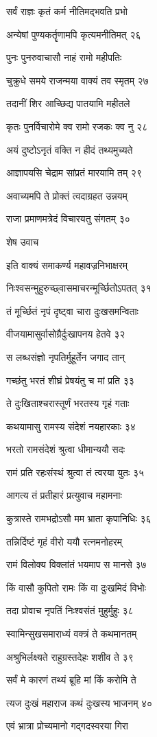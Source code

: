 सर्वं राज्ञः कृतं कर्म नीतिमद्भवति प्रभो

अन्येषां पुण्यकर्तॄणामपि कृत्यमनीतिमत् २६

पुनः पुनरुवाचासौ नाहं रामो महीपतिः

चुक्रुधे समये राजन्मया वाक्यं तव स्मृतम् २७

तदानीं शिर आच्छिद्य पातयामि महीतले

कृतः पुनर्विचारोमे क्व रामो रजकः क्व नु २८

अयं दुष्टोऽनृतं वक्ति न हीदं तथ्यमुच्यते

आज्ञापयसि चेद्राम सांप्रतं मारयामि तम् २९

अवाच्यमपि ते प्रोक्तं त्वदाग्रहत उन्नयम्

राजा प्रमाणमत्रेदं विचारयतु संगतम् ३०

शेष उवाच

इति वाक्यं समाकर्ण्य महावज्रनिभाक्षरम्

निःश्वसन्मुहुरुच्छ्वासमाचरन्मूर्च्छितोऽपतत् ३१

तं मूर्च्छितं नृपं दृष्ट्वा चारा दुःखसमन्विताः

वीजयामासुर्वासोग्रैर्दुःखापनय हेतवे ३२

स लब्धसंज्ञो नृपतिर्मुहूर्तेन जगाद तान्

गच्छंतु भरतं शीघ्रं प्रेषयंतु च मां प्रति ३३

ते दुःखिताश्चरास्तूर्णं भरतस्य गृहं गताः

कथयामासु रामस्य संदेशं नयहारकाः ३४

भरतो रामसंदेशं श्रुत्वा धीमान्ययौ सदः

रामं प्रति रहःसंस्थं श्रुत्वा तं त्वरया युतः ३५

आगत्य तं प्रतीहारं प्रत्युवाच महामनाः

कुत्रास्ते रामभद्रोऽसौ मम भ्राता कृपानिधिः ३६

तन्निर्दिष्टं गृहं वीरो ययौ रत्नमनोहरम्

रामं विलोक्य विक्लांतं भयमाप स मानसे ३७

किं वासौ कुपितो रामः किं वा दुःखमिदं विभोः

तदा प्रोवाच नृपतिं निःश्वसंतं मुहुर्मुहुः ३८

स्वामिन्सुखसमाराध्यं वक्त्रं ते कथमानतम्

अश्रुभिर्लक्ष्यते राहुग्रस्तदेहः शशीव ते ३९

सर्वं मे कारणं तथ्यं ब्रूहि मां किं करोमि ते

त्यज दुःखं महाराज कथं दुःखस्य भाजनम् ४०

एवं भ्रात्रा प्रोच्यमानो गद्गदस्वरया गिरा

